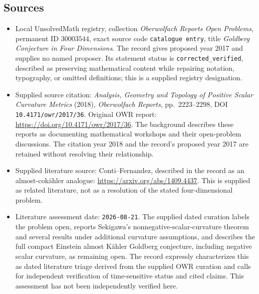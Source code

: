 \documentclass[11pt]{article}
\begin{document}
\subsection{Sources}
\begin{itemize}
\item Local UnsolvedMath registry, collection \emph{Oberwolfach Reports Open Problems}, permanent ID \(30003544\), exact source code \texttt{catalogue entry}, title \emph{Goldberg Conjecture in Four Dimensions}. The record gives proposed year 2017 and supplies no named proposer. Its statement status is \texttt{corrected\_verified}, described as preserving mathematical content while repairing notation, typography, or omitted definitions; this is a supplied registry designation.
\item Supplied source citation: \emph{Analysis, Geometry and Topology of Positive Scalar Curvature Metrics} (2018), \emph{Oberwolfach Reports}, pp.\ 2223--2298, DOI \texttt{10.4171/owr/2017/36}. Original OWR report: \url{https://doi.org/10.4171/owr/2017/36}. The background describes these reports as documenting mathematical workshops and their open-problem discussions. The citation year 2018 and the record's proposed year 2017 are retained without resolving their relationship.
\item Supplied literature source: Conti--Fernandez, described in the record as an almost-cokähler analogue: \url{https://arxiv.org/abs/1409.4437}. This is supplied as related literature, not as a resolution of the stated four-dimensional problem.
\item Literature assessment date: \texttt{2026-08-21}. The supplied dated curation labels the problem open, reports Sekigawa's nonnegative-scalar-curvature theorem and several results under additional curvature assumptions, and describes the full compact Einstein almost Kähler Goldberg conjecture, including negative scalar curvature, as remaining open. The record expressly characterizes this as dated literature triage derived from the supplied OWR curation and calls for independent verification of time-sensitive status and cited claims. This assessment has not been independently verified here.
\end{itemize}
\end{document}
